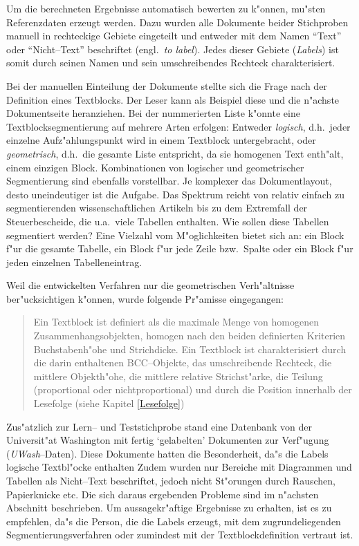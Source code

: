 Um die berechneten Ergebnisse automatisch bewerten zu k"onnen, mu"sten Referenzdaten erzeugt werden.
Dazu wurden alle Dokumente beider Stichproben manuell in rechteckige Gebiete eingeteilt und
entweder mit dem Namen "`Text"' oder "`Nicht--Text"' beschriftet (engl.\ {\em to label\/}).
Jedes dieser Gebiete ({\em Labels\/}) ist somit durch seinen Namen
und sein umschreibendes Rechteck charakterisiert.

Bei der manuellen Einteilung der Dokumente stellte sich die Frage nach der Definition
eines Textblocks. Der Leser kann als Beispiel diese und die n"achste Dokumentseite heranziehen. 
Bei der nummerierten Liste k"onnte eine Textblocksegmentierung
auf mehrere Arten erfolgen: Entweder {\em logisch\/}, d.h.\ jeder
einzelne Aufz"ahlungspunkt wird in einem Textblock untergebracht, oder {\em geometrisch\/}, d.h.\
die gesamte Liste entspricht, da sie homogenen Text enth"alt, einem einzigen Block. 
Kombinationen von logischer und geometrischer Segmentierung sind ebenfalls
vorstellbar. Je komplexer das Dokumentlayout, desto uneindeutiger ist die Aufgabe. Das Spektrum
reicht von relativ einfach zu segmentierenden wissenschaftlichen Artikeln bis zu dem
Extremfall der Steuerbescheide, die u.a.\ viele Tabellen enthalten. 
Wie sollen diese Tabellen segmentiert werden?
Eine Vielzahl vom M"oglichkeiten bietet sich an: ein Block
f"ur die gesamte Tabelle, ein Block f"ur jede Zeile bzw.\ Spalte oder ein Block f"ur jeden
einzelnen Tabelleneintrag.

Weil die entwickelten Verfahren nur die geometrischen Verh"altnisse ber"ucksichtigen
k"onnen, wurde folgende Pr"amisse eingegangen:
\begin{quote}
Ein Textblock ist definiert als die maximale Menge von homogenen Zusammenhangsobjekten,
homogen nach den beiden definierten Kriterien Buchstabenh"ohe und Strichdicke. 
Ein Textblock ist
charakterisiert durch die darin enthaltenen BCC--Objekte, das umschreibende Rechteck, die
mittlere Objekth"ohe, die mittlere relative Strichst"arke, die Teilung (proportional oder
nichtproportional) und durch die Position innerhalb der Lesefolge (siehe Kapitel
\ref{Lesefolge})
\end{quote}

Zus"atzlich zur Lern-- und Teststichprobe stand eine Datenbank von der 
Universit"at Washington mit fertig `gelabelten' Dokumenten zur Verf"ugung ({\em UWash\/}--Daten).
Diese Dokumente hatten die Besonderheit, da"s die Labels logische Textbl"ocke enthalten
Zudem wurden nur Bereiche mit
Diagrammen und Tabellen als Nicht--Text beschriftet, jedoch nicht St"orungen durch Rauschen,
Papierknicke etc. Die sich daraus ergebenden Probleme sind im n"achsten Abschnitt beschrieben.
Um aussagekr"aftige Ergebnisse zu erhalten, ist es zu empfehlen, da"s die Person,
die die Labels erzeugt, mit dem zugrundeliegenden Segmentierungsverfahren oder zumindest mit der
Textblockdefinition vertraut ist.

